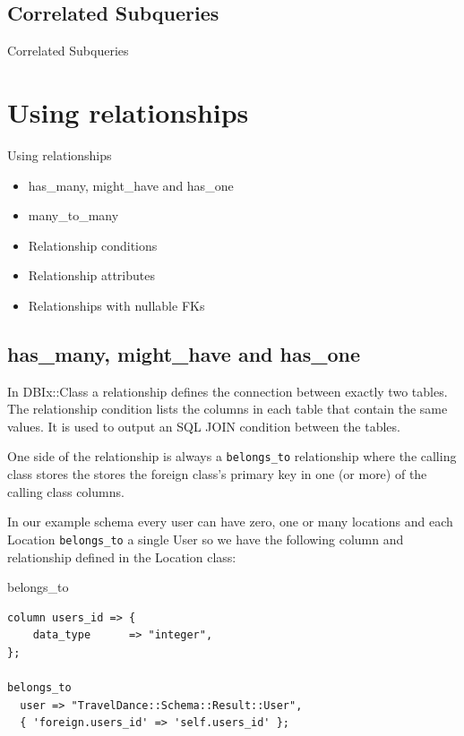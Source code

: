 \subsection{Correlated Subqueries}
\begin{frame}{Correlated Subqueries}
\end{frame}

\section{Using relationships}

\begin{frame}{Using relationships}
\begin{itemize}
\item has\_many, might\_have and has\_one
\item many\_to\_many
\item Relationship conditions
\item Relationship attributes
\item Relationships with nullable FKs
\end{itemize}
\end{frame}

\subsection{has\_many, might\_have and has\_one}

In DBIx::Class a relationship defines the connection between exactly two
tables. The relationship condition lists the columns in each table that
contain the same values. It is used to output an SQL JOIN condition between
the tables.

One side of the relationship is always a \verb|belongs_to| relationship
where the calling class stores the stores the foreign class’s primary key in
one (or more) of the calling class columns.

In our example schema every user can have zero, one or many locations and
each Location \verb|belongs_to| a single User so we have the following column and
relationship defined in the Location class: 
 
\begin{frame}[fragile]{belongs\_to}
\begin{lstlisting}
column users_id => {
    data_type      => "integer",
};

belongs_to
  user => "TravelDance::Schema::Result::User",
  { 'foreign.users_id' => 'self.users_id' };
\end{lstlisting}
\end{frame}


